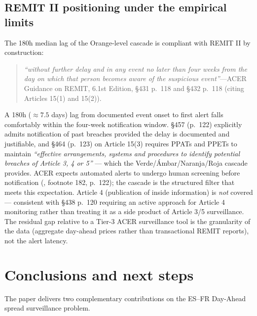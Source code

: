 \documentclass[11pt,a4paper]{article}
\begin{document}
\subsection{REMIT II positioning under the empirical
limits}\label{sec:remit-positioning}

The 180h median lag of the Orange-level cascade is compliant with
REMIT II by construction:

\begin{quote}
\textit{``without further delay and in any event no later than four
weeks from the day on which that person becomes aware of the
suspicious event''}---ACER Guidance on REMIT, 6.1st Edition,
§431 p.~118 and §432 p.~118 (citing Articles 15(1) and 15(2)).
\end{quote}

A 180h ($\approx 7.5$ days) lag from documented event onset to
first alert falls comfortably within the four-week notification
window. §457 (p.~122) explicitly admits notification of past
breaches provided the delay is documented and justifiable, and
\S464 (p.~123) on Article 15(3) requires PPATs and PPETs to
maintain \emph{``effective arrangements, systems and procedures
to identify potential breaches of Article 3, 4 or 5''} ---
which the Verde/Ámbar/Naranja/Roja cascade provides. ACER expects
automated alerts to undergo human screening before notification
(\citealp{ACER2024}, footnote 182, p.~122); the cascade is the
structured filter that meets this expectation. Article 4
(publication of inside information) is \emph{not} covered ---
consistent with \citet{ACER2024} §438 p.~120 requiring an active
approach for Article 4 monitoring rather than treating it as a
side product of Article 3/5 surveillance. The residual gap
relative to a Tier-3 ACER surveillance tool is the granularity of
the data (aggregate day-ahead prices rather than transactional
REMIT reports), not the alert latency.

\section{Conclusions and next steps}\label{sec:conclusions}

The paper delivers two complementary contributions on the
ES--FR Day-Ahead spread surveillance problem.
\end{document}
